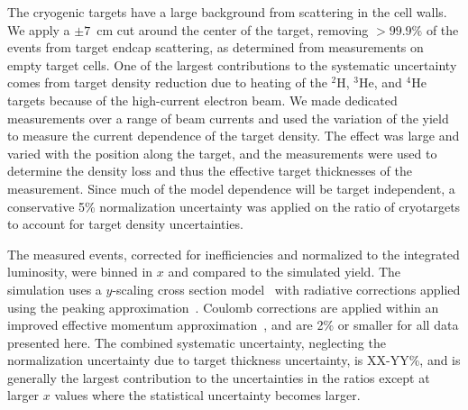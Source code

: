 
The cryogenic targets have a large background from scattering in the cell walls. We apply a $\pm 7$~cm
cut around the center of the target, removing $>99.9\%$ of the events from target endcap
scattering, as determined from measurements on empty target cells. One of the largest contributions to the
systematic uncertainty comes from target density reduction due to heating of the $^2$H, $^3$He, and $^4$He
targets because of the high-current electron beam. We made dedicated measurements over a range of
beam currents and used the variation of the yield to measure the current dependence of the target density.
The effect was large and varied with the position along the target, and the measurements were used to
determine the density loss and thus the effective target thicknesses of the measurement. Since much 
of the model dependence will be target independent, a conservative 5\% normalization uncertainty was applied
on the ratio of cryotargets to account for target density uncertainties.


The measured events, corrected for inefficiencies and normalized to the integrated luminosity, were binned
in $x$ and compared to the simulated yield. The simulation uses a $y$-scaling cross section
model~\cite{day_arns, arrington99} with radiative corrections applied using the peaking
approximation~\cite{zye_thesis, stein75}. Coulomb corrections are applied within an improved effective
momentum approximation~\cite{aste05}, and are 2\% or smaller for all data presented here.  The combined 
systematic uncertainty, neglecting the normalization uncertainty due to target thickness uncertainty,
is XX-YY\%, and is generally the largest contribution to the uncertainties in the ratios except at larger
$x$ values where the statistical uncertainty becomes larger.



